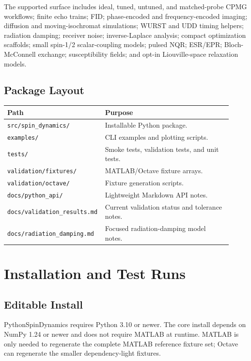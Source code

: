 \documentclass[11pt,oneside]{report}
\newcommand{\code}[1]{\texttt{#1}}
\begin{document}
The supported surface includes ideal, tuned, untuned, and matched-probe CPMG
workflows; finite echo trains; FID; phase-encoded and frequency-encoded
imaging; diffusion and moving-isochromat simulations; WURST and UDD timing
helpers; radiation damping; receiver noise; inverse-Laplace analysis; compact
optimization scaffolds; small spin-1/2 scalar-coupling models; pulsed NQR;
ESR/EPR; Bloch-McConnell exchange; susceptibility fields; and opt-in
Liouville-space relaxation models.

\section{Package Layout}

\begin{longtable}{p{0.36\linewidth}p{0.56\linewidth}}
\toprule
Path & Purpose \\
\midrule
\code{src/spin\_dynamics/} & Installable Python package. \\
\code{examples/} & CLI examples and plotting scripts. \\
\code{tests/} & Smoke tests, validation tests, and unit tests. \\
\code{validation/fixtures/} & MATLAB/Octave fixture arrays. \\
\code{validation/octave/} & Fixture generation scripts. \\
\code{docs/python\_api/} & Lightweight Markdown API notes. \\
\code{docs/validation\_results.md} & Current validation status and tolerance notes. \\
\code{docs/radiation\_damping.md} & Focused radiation-damping model notes. \\
\bottomrule
\end{longtable}

\chapter{Installation and Test Runs}

\section{Editable Install}

PythonSpinDynamics requires Python 3.10 or newer. The core install depends on
NumPy 1.24 or newer and does not require MATLAB at runtime. MATLAB is only
needed to regenerate the complete MATLAB reference fixture set; Octave can
regenerate the smaller dependency-light fixtures.
\end{document}
